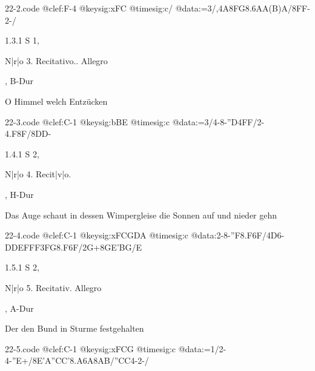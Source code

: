 \documentclass[a4paper, twocolumn, 11pt]{book}
\begin{document}
\begin{filecontents*}{22-2.code}
@clef:F-4
@keysig:xFC
@timesig:c/
@data:=3/,4A8FG8.6AA(B)A/8FF-2-/
\end{filecontents*}
\newline %
\par 1.3.1  S 1, \begin{itshape}N|r|o 3. Recitativo.. Allegro\end{itshape}, B-Dur\newline \begin{footnotesize} O Himmel welch Entzücken \end{footnotesize}  
\begin{filecontents*}{22-3.code}
@clef:C-1
@keysig:bBE
@timesig:c
@data:=3/4-8-''D4FF/2-4.F8F/8DD-
\end{filecontents*}
\newline %
\par 1.4.1  S 2, \begin{itshape}N|r|o 4. Recit|v|o.\end{itshape}, H-Dur\newline \begin{footnotesize} Das Auge schaut in dessen Wimpergleise die Sonnen auf und nieder gehn \end{footnotesize}  
\begin{filecontents*}{22-4.code}
@clef:C-1
@keysig:xFCGDA
@timesig:c
@data:2-8-''F8.F6F/4D6-DDEFFF3FG8.F6F/2G+8GE'BG/E
\end{filecontents*}
\newline %
\par 1.5.1  S 2, \begin{itshape}N|r|o 5. Recitativ. Allegro\end{itshape}, A-Dur\newline \begin{footnotesize} Der den Bund in Sturme festgehalten \end{footnotesize}  
\begin{filecontents*}{22-5.code}
@clef:C-1
@keysig:xFCG
@timesig:c
@data:=1/2-4-''E+/8E'A''CC'8.A6A8AB/''CC4-2-/
\end{filecontents*}
\end{document}
